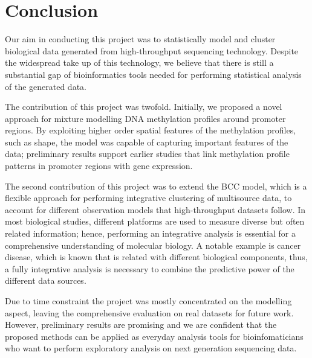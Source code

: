 \chapter{Conclusion} \label{conclusion-chapter}
Our aim in conducting this project was to statistically model and cluster biological data generated from high-throughput sequencing technology. Despite the widespread take up of this technology, we believe that there is still a substantial gap of bioinformatics tools needed for performing statistical analysis of the generated data.

The contribution of this project was twofold. Initially, we proposed a novel approach for mixture modelling DNA methylation profiles around promoter regions. By exploiting higher order spatial features of the methylation profiles, such as shape, the model was capable of capturing important features of the data; preliminary results support earlier studies that link methylation profile patterns in promoter regions with gene expression. 

The second contribution of this project was to extend the BCC model, which is a flexible approach for performing integrative clustering of multisource data, to account for different observation models that high-throughput datasets follow. In most biological studies, different platforms are used to measure diverse but often related information; hence, performing an integrative analysis is essential for a comprehensive understanding of molecular biology. A notable example is cancer disease, which is known that is related with different biological components, thus, a fully integrative analysis is necessary to combine the predictive power of the different data sources.  

Due to time constraint the project was mostly concentrated on the modelling aspect, leaving the comprehensive evaluation on real datasets for future work. However, preliminary results are promising and we are confident that the proposed methods can be applied as everyday analysis tools for bioinfomaticians who want to perform exploratory analysis on next generation sequencing data.


